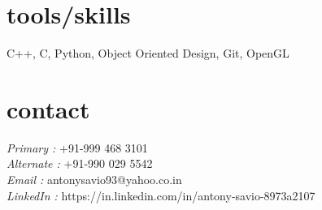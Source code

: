 \documentclass[margin]{res}
\begin{document}
\begin{resume}
        
		
\section{tools/skills}  C++, C, Python, Object Oriented Design, Git, OpenGL \\
            
\section{contact}
	   {\sl Primary :}
	   +91-999 468 3101 \\
	   {\sl Alternate :}
	   +91-990 029 5542 \\
	   {\sl Email :}
	   antonysavio93@yahoo.co.in \\
	   {\sl LinkedIn :}
	   https://in.linkedin.com/in/antony-savio-8973a2107 \\ 

\end{resume}
\end{document}
